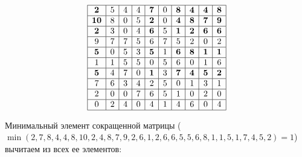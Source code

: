 \documentclass[17pt]{extarticle}
\begin{document}
\[
    \begin{array}{|*{10}{c|}}
        \hline
        \textbf{2}  & 5 & 4 & 4 & \textbf{7} & 0 & \textbf{8} & \textbf{4} & \textbf{4} & \textbf{8} \\
        \hline
        \textbf{10} & 8 & 0 & 5 & \textbf{2} & 0 & \textbf{4} & \textbf{8} & \textbf{7} & \textbf{9} \\
        \hline
        \textbf{2}  & 3 & 0 & 4 & \textbf{6} & 5 & \textbf{1} & \textbf{2} & \textbf{6} & \textbf{6} \\
        \hline
        9           & 7 & 7 & 5 & 6          & 7 & 5          & 2          & 0          & 2          \\
        \hline
        \textbf{5}  & 0 & 5 & 3 & \textbf{5} & 1 & \textbf{6} & \textbf{8} & \textbf{1} & \textbf{1} \\
        \hline
        1           & 1 & 5 & 5 & 0          & 5 & 6          & 0          & 1          & 6          \\
        \hline
        \textbf{5}  & 4 & 7 & 0 & \textbf{1} & 3 & \textbf{7} & \textbf{4} & \textbf{5} & \textbf{2} \\
        \hline
        7           & 6 & 3 & 4 & 2          & 5 & 0          & 1          & 3          & 1          \\
        \hline
        2           & 0 & 0 & 7 & 6          & 5 & 1          & 0          & 2          & 0          \\
        \hline
        0           & 2 & 4 & 0 & 4          & 1 & 4          & 6          & 0          & 4          \\
        \hline
    \end{array}
\]

Минимальный элемент сокращенной матрицы (\(\min(2, 7, 8, 4, 4, 8, 10, 2, 4, 8, 7, 9, 2, 6, 1, 2, 6, 6, 5, 5, 6, 8, 1, 1, 5, 1, 7, 4, 5, 2) = 1\)) вычитаем из всех ее элементов:
\end{document}
